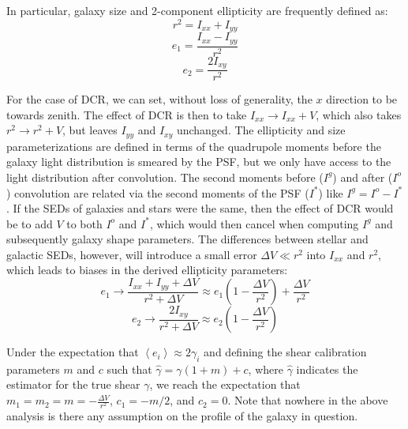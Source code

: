 \documentclass[apj]{emulateapj}
\begin{document}
In particular, galaxy size and 2-component ellipticity are frequently defined as:
\begin{equation}
  r^2 = I_{xx} + I_{yy}
\end{equation}
\begin{equation}
  e_1 = \frac{I_{xx} - I_{yy}}{r^2}
\end{equation}
\begin{equation}
  e_2 = \frac{2 I_{xy}}{r^2}
\end{equation}

For the case of DCR, we can set, without loss of generality, the $x$
direction to be towards zenith.  The effect of DCR is then to take
$I_{xx} \rightarrow I_{xx} + V$, which also takes $r^2 \rightarrow r^2
+ V$, but leaves $I_{yy}$ and $I_{xy}$ unchanged.  The ellipticity and
size parameterizations are defined in terms of the quadrupole moments
before the galaxy light distribution is smeared by the PSF, but we
only have access to the light distribution after convolution.  The
second moments before ($I^g$) and after ($I^o$) convolution are
related via the second moments of the PSF ($I^*$) like $I^g = I^o -
I^*$.  If the SEDs of galaxies and stars were the same, then the
effect of DCR would be to add $V$ to both $I^o$ and $I^*$, which would
then cancel when computing $I^g$ and subsequently galaxy shape
parameters.  The differences between stellar and galactic SEDs,
however, will introduce a small error $\Delta V \ll r^2$ into $I_{xx}$
and $r^2$, which leads to biases in the derived ellipticity
parameters:
\begin{equation}
  e_1 \rightarrow \frac{I_{xx} + I_{yy} + \Delta V}{r^2 + \Delta V} \approx e_1 \left(1 - \frac{\Delta V}{r^2}\right) + \frac{\Delta V}{r^2}
\end{equation}
\begin{equation}
  e_2 \rightarrow \frac{2 I_{xy}}{r^2 + \Delta V} \approx e_2 \left(1 - \frac{\Delta V}{r^2}\right)
\end{equation}

Under the expectation that $\left<e_i\right> \approx 2\gamma_i$ and
defining the shear calibration parameters $m$ and $c$ such that
$\hat{\gamma} = \gamma (1 + m) + c$, where $\hat{\gamma}$ indicates
the estimator for the true shear $\gamma$, we reach the expectation
that $m_1 = m_2 = m = -\frac{\Delta V}{r^2}$, $c_1 = -m/2$, and $c_2 =
0$.  Note that nowhere in the above analysis is there any assumption
on the profile of the galaxy in question.
\end{document}
